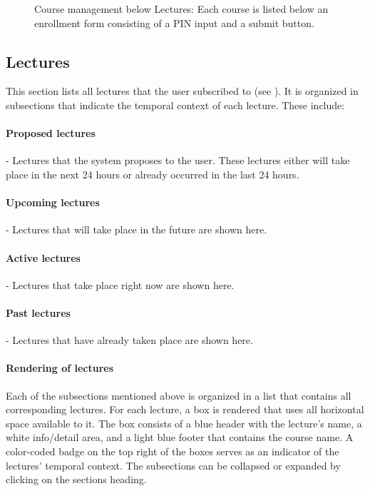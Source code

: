 \begin{figure}
\begin{minipage}[t]{.5\textwidth}
		\captionsetup{width=.9\linewidth}
		\captionsetup{format=plain}
		\caption{Course management below Lectures: Each course is listed below an enrollment form consisting of a PIN input and a submit button.}
		\label{fig:mainviewcoursemanagement}
	\end{minipage}
\end{figure}

\subsection{Lectures}
\label{section:soa:mainview:lectures}
This section lists all lectures that the user subscribed to (see ). It is organized in subsections that indicate the temporal context of each lecture. These include:

\paragraph{Proposed lectures} - Lectures that the system proposes to the user. These lectures either will take place in the next 24 hours or already occurred in the last 24 hours.
\paragraph{Upcoming lectures} - Lectures that will take place in the future are shown here.
\paragraph{Active lectures} - Lectures that take place right now are shown here.
\paragraph{Past lectures} - Lectures that have already taken place are shown here.

\paragraph{Rendering of lectures}

Each of the subsections mentioned above is organized in a list that contains all corresponding lectures. For each lecture, a box is rendered that uses all horizontal space available to it. The box consists of a blue header with the lecture's name, a white info/detail area, and a light blue footer that contains the course name.
A color-coded badge on the top right of the boxes serves as an indicator of the lectures' temporal context.
The subsections can be collapsed or expanded by clicking on the sections heading.

